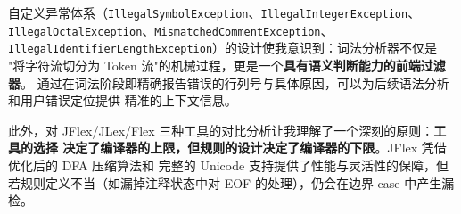 \documentclass[a4paper]{article}
\begin{document}
自定义异常体系（\texttt{IllegalSymbolException}、\texttt{IllegalIntegerException}、
\texttt{IllegalOctalException}、\texttt{MismatchedCommentException}、
\texttt{IllegalIdentifierLengthException}）的设计使我意识到：词法分析器不仅是
"将字符流切分为 Token 流"的机械过程，更是一个\textbf{具有语义判断能力的前端过滤器}。
通过在词法阶段即精确报告错误的行列号与具体原因，可以为后续语法分析和用户错误定位提供
精准的上下文信息。

此外，对 JFlex/JLex/Flex 三种工具的对比分析让我理解了一个深刻的原则：\textbf{工具的选择
决定了编译器的上限，但规则的设计决定了编译器的下限}。JFlex 凭借优化后的 DFA 压缩算法和
完整的 Unicode 支持提供了性能与灵活性的保障，但若规则定义不当（如漏掉注释状态中对 EOF
的处理），仍会在边界 case 中产生漏检。
\end{document}
